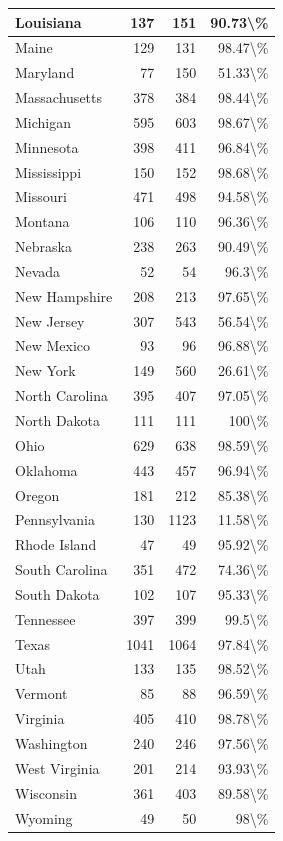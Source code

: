 \documentclass[
]{krantz}
\begin{document}
\begin{longtable}[t]{l|r|r|r}
\hline
Louisiana & 137 & 151 & 90.73\textbackslash{}\%\\
\hline
Maine & 129 & 131 & 98.47\textbackslash{}\%\\
\hline
Maryland & 77 & 150 & 51.33\textbackslash{}\%\\
\hline
Massachusetts & 378 & 384 & 98.44\textbackslash{}\%\\
\hline
Michigan & 595 & 603 & 98.67\textbackslash{}\%\\
\hline
Minnesota & 398 & 411 & 96.84\textbackslash{}\%\\
\hline
Mississippi & 150 & 152 & 98.68\textbackslash{}\%\\
\hline
Missouri & 471 & 498 & 94.58\textbackslash{}\%\\
\hline
Montana & 106 & 110 & 96.36\textbackslash{}\%\\
\hline
Nebraska & 238 & 263 & 90.49\textbackslash{}\%\\
\hline
Nevada & 52 & 54 & 96.3\textbackslash{}\%\\
\hline
New Hampshire & 208 & 213 & 97.65\textbackslash{}\%\\
\hline
New Jersey & 307 & 543 & 56.54\textbackslash{}\%\\
\hline
New Mexico & 93 & 96 & 96.88\textbackslash{}\%\\
\hline
New York & 149 & 560 & 26.61\textbackslash{}\%\\
\hline
North Carolina & 395 & 407 & 97.05\textbackslash{}\%\\
\hline
North Dakota & 111 & 111 & 100\textbackslash{}\%\\
\hline
Ohio & 629 & 638 & 98.59\textbackslash{}\%\\
\hline
Oklahoma & 443 & 457 & 96.94\textbackslash{}\%\\
\hline
Oregon & 181 & 212 & 85.38\textbackslash{}\%\\
\hline
Pennsylvania & 130 & 1123 & 11.58\textbackslash{}\%\\
\hline
Rhode Island & 47 & 49 & 95.92\textbackslash{}\%\\
\hline
South Carolina & 351 & 472 & 74.36\textbackslash{}\%\\
\hline
South Dakota & 102 & 107 & 95.33\textbackslash{}\%\\
\hline
Tennessee & 397 & 399 & 99.5\textbackslash{}\%\\
\hline
Texas & 1041 & 1064 & 97.84\textbackslash{}\%\\
\hline
Utah & 133 & 135 & 98.52\textbackslash{}\%\\
\hline
Vermont & 85 & 88 & 96.59\textbackslash{}\%\\
\hline
Virginia & 405 & 410 & 98.78\textbackslash{}\%\\
\hline
Washington & 240 & 246 & 97.56\textbackslash{}\%\\
\hline
West Virginia & 201 & 214 & 93.93\textbackslash{}\%\\
\hline
Wisconsin & 361 & 403 & 89.58\textbackslash{}\%\\
\hline
Wyoming & 49 & 50 & 98\textbackslash{}\%\\
\hline
\end{longtable}
\end{document}
